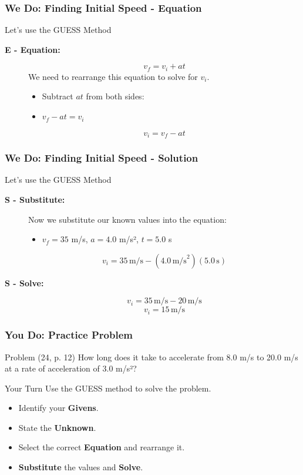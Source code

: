\documentclass{beamer}
\begin{document}
\begin{frame}
\frametitle{We Do: Finding Initial Speed - Equation}
\begin{block}{Let's use the GUESS Method}
\begin{description}
    \item[\textbf{E - Equation:}]
        \[ v_f = v_i + at \]
        \alert{We need to rearrange this equation to solve for $v_i$.}
        \pause
        \begin{itemize}
            \item Subtract $at$ from both sides:
            \item $v_f - at = v_i$
        \end{itemize}
        \pause
        \[ v_i = v_f - at \]
\end{description}
\end{block}
\end{frame}

\begin{frame}
\frametitle{We Do: Finding Initial Speed - Solution}
\begin{block}{Let's use the GUESS Method}
\begin{description}
    \item[\textbf{S - Substitute:}]
        \alert{Now we substitute our known values into the equation:}
        \pause
        \begin{itemize}
            \item $v_f = 35$ m/s, $a = 4.0$ m/s², $t = 5.0$ s
        \end{itemize}
        \[ v_i = 35 \, \text{m/s} - (4.0 \, \text{m/s}^2)(5.0 \, \text{s}) \]
    \item[\textbf{S - Solve:}]
        \[ v_i = 35 \, \text{m/s} - 20 \, \text{m/s} \]
        \[ v_i = 15 \, \text{m/s} \]
\end{description}
\end{block}
\end{frame}

\begin{frame}
\frametitle{You Do: Practice Problem}
\begin{block}{Problem (24, p. 12)}
How long does it take to accelerate from 8.0 m/s to 20.0 m/s at a rate of acceleration of 3.0 m/s²?
\end{block}
\vfill
\begin{alertblock}{Your Turn}
Use the GUESS method to solve the problem.
\begin{itemize}
    \item Identify your \textbf{Givens}.
    \item State the \textbf{Unknown}.
    \item Select the correct \textbf{Equation} and rearrange it.
    \item \textbf{Substitute} the values and \textbf{Solve}.
\end{itemize}
\end{alertblock}
\end{frame}
\end{document}
